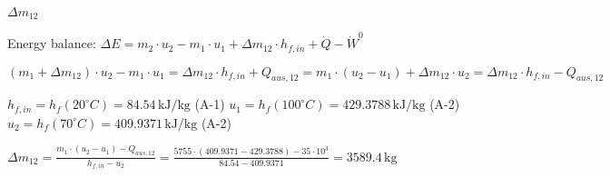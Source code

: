 \( \Delta m_{12} \)  

Energy balance:  
\( \Delta E = m_{2} \cdot u_{2} - m_{1} \cdot u_{1} + \Delta m_{12} \cdot h_{f,in} + \dot{Q} - \dot{W}^{0} \)  

\( (m_{1} + \Delta m_{12}) \cdot u_{2} - m_{1} \cdot u_{1} = \Delta m_{12} \cdot h_{f,in} + Q_{aus,12} = m_{1} \cdot (u_{2} - u_{1}) + \Delta m_{12} \cdot u_{2} = \Delta m_{12} \cdot h_{f,in} - Q_{aus,12} \)  

\( h_{f,in} = h_{f}(20^\circ C) = 84.54 \, \text{kJ/kg} \) (A-1)  
\( u_{1} = h_{f}(100^\circ C) = 429.3788 \, \text{kJ/kg} \) (A-2)  
\( u_{2} = h_{f}(70^\circ C) = 409.9371 \, \text{kJ/kg} \) (A-2)  

\( \Delta m_{12} = \frac{m_{1} \cdot (u_{2} - u_{1}) - Q_{aus,12}}{h_{f,in} - u_{2}} = \frac{5755 \cdot (409.9371 - 429.3788) - 35 \cdot 10^{3}}{84.54 - 409.9371} = 3589.4 \, \text{kg} \)